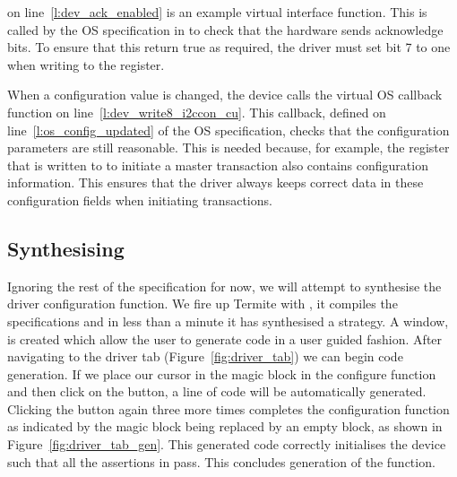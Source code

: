  on line~\ref{l:dev_ack_enabled} is an example virtual interface function. This is called by the OS specification in  to check that the hardware sends acknowledge bits. To ensure that this return true as required, the driver must set bit 7 to one when writing to the  register.

When a configuration value is changed, the device calls the virtual OS callback function  on line~\ref{l:dev_write8_i2ccon_cu}. This callback, defined on line~\ref{l:os_config_updated} of the OS specification, checks that the configuration parameters are still reasonable. This is needed because, for example, the register that is written to to initiate a master transaction also contains configuration information. This ensures that the driver always keeps correct data in these configuration fields when initiating transactions.

\subsection{Synthesising}
Ignoring the rest of the specification for now, we will attempt to synthesise the driver configuration function. We fire up Termite with , it compiles the specifications and in less than a minute it has synthesised a strategy. A window, is created which allow the user to generate code in a user guided fashion. After navigating to the driver tab (Figure~\ref{fig:driver_tab}) we can begin code generation. If we place our cursor in the magic block in the configure function and then click on the  button, a line of code will be automatically generated. Clicking the  button again three more times completes the configuration function as indicated by the magic block being replaced by an empty block, as shown in Figure~\ref{fig:driver_tab_gen}. This generated code correctly initialises the device such that all the assertions in  pass. This concludes generation of the  function.

